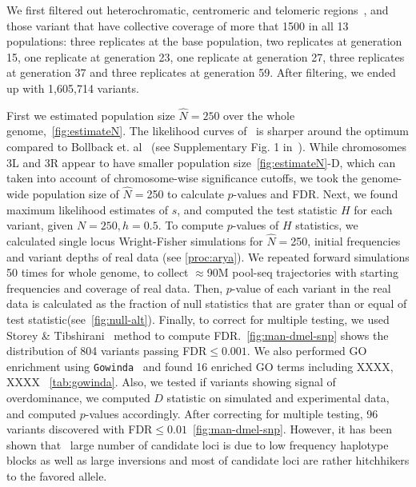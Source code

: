 We first filtered out heterochromatic,
centromeric and telomeric
regions~\cite{fiston2010drosophila}, and those variant that have collective 
coverage of more that 1500 in all 13 populations: three replicates at the base 
population, two replicates at generation 15, one replicate at generation 23, 
one replicate at generation 27, three replicates at generation 37 and three 
replicates at generation 59. After filtering, we ended up with 1,605,714 
variants.

First we estimated population size $\hat{N}=250$ over the whole 
genome,~\ref{fig:estimateN}. 
The likelihood curves of \comale\ is sharper around the optimum compared to 
Bollback et. al~\cite{bollback2008estimation} (see Supplementary Fig. 1 
in~\cite{orozco2012adaptation}).
While chromosomes 3L and 3R 
appear to have smaller population size~\ref{fig:estimateN}-D, which can taken 
into account of 
chromosome-wise significance cutoffs, we took the genome-wide population size 
of $\widehat{N}=$250 to calculate $p$-values and FDR.
Next, we found maximum likelihood estimates of $s$, and computed the test 
statistic $H$ for each variant, given $N=250, h=0.5$. To compute $p$-values of 
$H$ statistics, we calculated 
single locus Wright-Fisher simulations for $\widehat{N}=$250, initial 
frequencies and variant depths of real data (see \ref{proc:arya}). We repeated 
forward simulations 50 times for whole genome, to collect $\approx$90M pool-seq 
trajectories 
with starting frequencies and coverage of real data. Then, $p$-value of each 
variant in the real 
data is calculated as the fraction of null statistics that are grater than or 
equal of test statistic(see~\ref{fig:null-alt}). Finally, to correct for 
multiple 
testing, we used 
Storey \& Tibshirani~\cite{storey2003statistical} method to compute 
FDR.~\ref{fig:man-dmel-snp} shows the distribution of 804 variants 
passing FDR$\le 
0.001$. We also performed GO
enrichment using \texttt{Gowinda}~\cite{kofler2012gowinda} and found 16 
enriched GO terms including XXXX, XXXX ~\ref{tab:gowinda}. Also, we tested 
if variants showing signal of overdominance, we computed $D$ 
statistic on simulated and experimental data, and computed $p$-values 
accordingly. After correcting for multiple testing, 96 variants discovered with 
FDR$\le 0.01$~\ref{fig:man-dmel-snp}. However, it has been shown 
that~\cite{tobler2014massive,franssen2015patterns}  large number of candidate 
loci is due to low frequency haplotype blocks as 
well as large inversions and most of candidate loci are rather hitchhikers to 
the favored allele.

